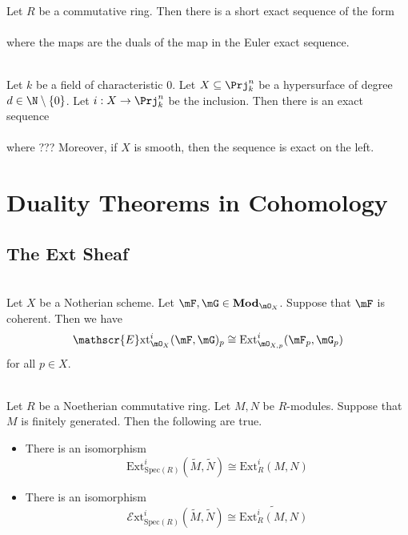 \documentclass[a4paper]{article}
\begin{document}
\begin{crl}{}{}\\
Let $R$ be a commutative ring. Then there is a short exact sequence of the form \\
 \\ where the maps are the duals of the map in the Euler exact sequence. 
\end{crl}

\begin{prp}{}{}\\
Let $k$ be a field of characteristic $0$. Let $X\subseteq\Prj_k^n$ be a hypersurface of degree $d\in\N\setminus\{0\}$. Let $i:X\to\Prj_k^n$ be the inclusion. Then there is an exact sequence \\
 \\
where ??? Moreover, if $X$ is smooth, then the sequence is exact on the left. 
\end{prp}

\pagebreak
\section{Duality Theorems in Cohomology}
\subsection{The Ext Sheaf}
\begin{prp}{}{}\\
Let $X$ be a Notherian scheme. Let $\mF,\mG\in\bold{Mod}_{\mO_X}$. Suppose that $\mF$ is coherent. Then we have $$\mathscr{E}\text{xt}_{\mO_X}^i(\mF,\mG)_p\cong\text{Ext}_{\mO_{X,p}}^i(\mF_p,\mG_p)$$ for all $p\in X$. 
\end{prp}

\begin{prp}{}{}\\
Let $R$ be a Noetherian commutative ring. Let $M,N$ be $R$-modules. Suppose that $M$ is finitely generated. Then the following are true. 
\begin{itemize}
\item There is an isomorphism $$\text{Ext}_{\text{Spec}(R)}^i(\widetilde{M},\widetilde{N})\cong\text{Ext}_R^i(M,N)$$
\item There is an isomorphism $$\mathscr{E}\text{xt}_{\text{Spec}(R)}^i(\widetilde{M},\widetilde{N})\cong\widetilde{\text{Ext}_R^i(M,N)}$$
\end{itemize}
\end{prp}
\end{document}
